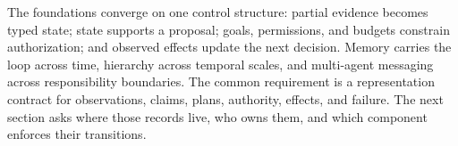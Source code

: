 The foundations converge on one control structure: partial evidence becomes typed state; state supports a proposal; goals, permissions, and budgets constrain authorization; and observed effects update the next decision. Memory carries the loop across time, hierarchy across temporal scales, and multi-agent messaging across responsibility boundaries. The common requirement is a representation contract for observations, claims, plans, authority, effects, and failure. The next section asks where those records live, who owns them, and which component enforces their transitions.
